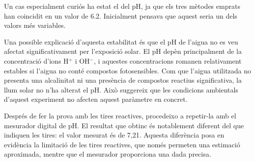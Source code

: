 Un cas especialment curiós ha estat el del pH, ja que els tres mètodes emprats han coincidit en un valor de 6.2. Inicialment pensava que aquest seria un dels valors més variables.

Una possible explicació d’aquesta estabilitat és que el pH de l’aigua no es veu afectat significativament per l’exposició solar. El pH depèn principalment de la concentració d’ions H$^+$ i OH$^-$, i aquestes concentracions romanen relativament estables si l’aigua no conté compostos fotosensibles. Com que l’aigua utilitzada no presenta una alcalinitat ni una presència de compostos reactius significativa, la llum solar no n’ha alterat el pH. Això suggereix que les condicions ambientals d’aquest experiment no afecten aquest paràmetre en concret.

Després de fer la prova amb les tires reactives, procedeixo a repetir-la amb el mesurador digital de pH. El resultat que obtinc és notablement diferent del que indiquen les tires: el valor mesurat és de 7,21. Aquesta diferència posa en evidència la limitació de les tires reactives, que només permeten una estimació aproximada, mentre que el mesurador proporciona una dada precisa.

